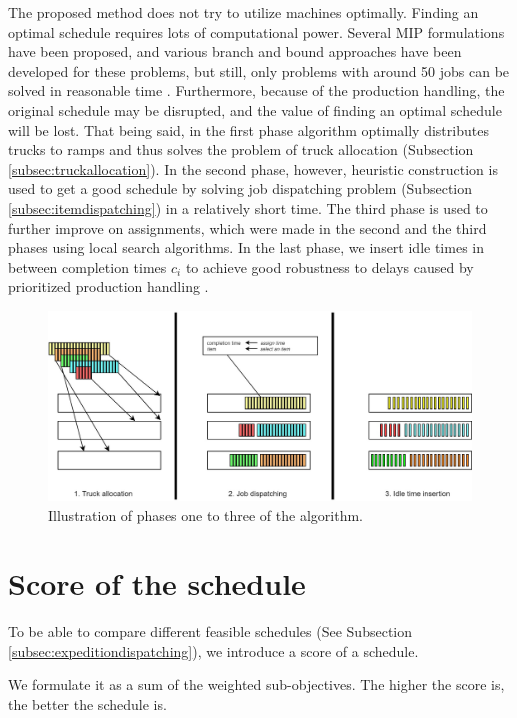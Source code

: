 \documentclass{ctuthesis}
\begin{document}
The proposed method does not try to utilize machines optimally. Finding an optimal schedule requires lots of computational power. Several MIP formulations have been proposed, and various branch and bound approaches have been developed for these problems, but still, only problems with around 50 jobs can be solved in reasonable time \cite{pinedo}. Furthermore, because of the production handling, the original schedule may be disrupted, and the value of finding an optimal schedule will be lost. That being said, in the first phase algorithm optimally distributes trucks to ramps and thus solves the problem of truck allocation (Subsection \ref{subsec:truckallocation}). In the second phase, however, heuristic construction is used to get a good schedule by solving job dispatching problem (Subsection \ref{subsec:itemdispatching}) in a relatively short time. The third phase is used to further improve on assignments, which were made in the second and the third phases using local search algorithms. In the last phase, we insert idle times in between completion times $c_i$ to achieve good robustness to delays caused by prioritized production handling \cite{pinedo}. 

\begin{figure}[H]
\includegraphics[width=1.0\linewidth]{algo.jpg}
\caption{Illustration of phases one to three of the algorithm.}
\end{figure}

\section{Score of the schedule}

To be able to compare different feasible schedules (See Subsection \ref{subsec:expeditiondispatching}), we introduce a score of a schedule. 

We formulate it as a sum of the weighted sub-objectives. The higher the score is, the better the schedule is.
\end{document}
